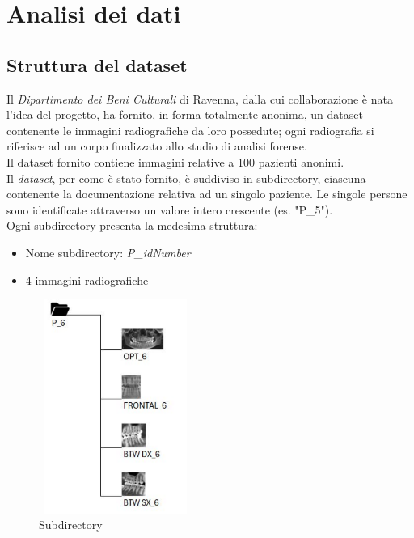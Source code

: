 \documentclass[12pt,a4paper,openright,twoside]{book}
\begin{document}

\chapter{Analisi dei dati}

\section{Struttura del dataset}
Il {\itshape Dipartimento dei Beni Culturali} di Ravenna, dalla cui collaborazione è nata l'idea del progetto, ha fornito, in forma totalmente anonima, un dataset contenente le immagini radiografiche da loro possedute; ogni radiografia si riferisce ad un corpo finalizzato allo studio di analisi forense. \\
Il dataset fornito contiene immagini relative a 100 pazienti anonimi.\\
Il {\itshape dataset}, per come è stato fornito, è suddiviso in subdirectory, ciascuna contenente la documentazione relativa ad un singolo paziente. Le singole persone sono identificate attraverso un valore intero crescente (es. "P\_5"). \\
Ogni subdirectory presenta la medesima struttura: 
\begin{itemize}
\item Nome subdirectory: {\itshape P\_idNumber}
\item 4 immagini radiografiche
\end{itemize}
\newpage
\begin{figure}[H]
    \centering
    \includegraphics[height=7cm,width=5cm]{figures/subdir.pdf}
    \caption{Subdirectory}
    \label{fig:subdirectory}
\end{figure}
\end{document}
